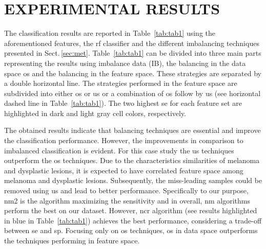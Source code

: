 \graphicspath{ {./content/Experiments-results/figures/} }


\section{\uppercase{Experimental Results}}
\label{sec:exp-res} 

\noindent The classification results are reported in Table~\ref{tab:tab1} using the aforementioned features, the \ac{rf} classifier and the different imbalancing techniques presented in Sect.\,\ref{sec:met}. 
Table~\ref{tab:tab1} can be divided into three main parts representing the results using imbalance data (IB), the balancing in the data space \ac{os} and the balancing in the feature space.
These strategies are separated by a double horizontal line.
The strategies performed in the feature space are subdivided into either \ac{os} or \ac{us} or a combination of \ac{os} follow by \ac{us} (see horizontal dashed line in Table~\ref{tab:tab1}).
The two highest \ac{se} for each feature set are highlighted in dark and light gray cell colors, respectively. 

The obtained results indicate that balancing techniques are essential and improve the classification performance. 
However, the improvements in comparison to imbalanced classification is evident. 
For this case study the \ac{us} techniques outperform the \ac{os} techniques. 
Due to the characteristics similarities of melanoma and dysplastic lesions, it is expected to have correlated feature space among melanoma and dysplastic lesions. 
Subsequently, the miss-leading samples could be removed using \ac{us} and lead to better performance.
Specifically to our purpose, \ac{nm2} is the algorithm maximizing the sensitivity and in overall, \ac{nm} algorithms perform the best on our dataset. 
However, \ac{ncr} algorithm (see results highlighted in blue in Table~\ref{tab:tab1}) achieves the best performance, considering a trade-off between \ac{se} and \ac{sp}. 
Focusing only on \ac{os} techniques, \ac{os} in data space outperforms the techniques performing in feature space.




